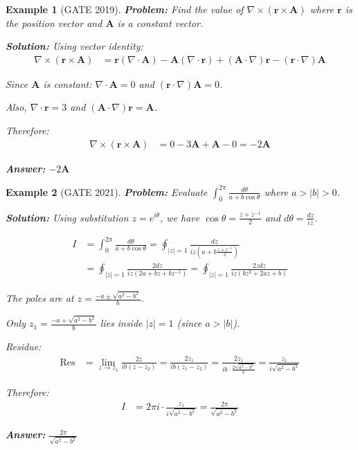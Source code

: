 \documentclass[12pt,a4paper]{article}
\newtheorem{example}{Example}[section]
\newcommand{\ans}[1]{\textcolor{red!70!black}{\textbf{Answer:} #1}}
\newcommand{\sol}{\textcolor{blue!70!black}{\textbf{Solution:}}}
\begin{document}
\begin{example}[GATE 2019]
\textbf{Problem:} Find the value of $\nabla \times (\mathbf{r} \times \mathbf{A})$ where $\mathbf{r}$ is the position vector and $\mathbf{A}$ is a constant vector.

\sol
Using vector identity:
\begin{align}
\nabla \times (\mathbf{r} \times \mathbf{A}) &= \mathbf{r}(\nabla \cdot \mathbf{A}) - \mathbf{A}(\nabla \cdot \mathbf{r}) + (\mathbf{A} \cdot \nabla)\mathbf{r} - (\mathbf{r} \cdot \nabla)\mathbf{A}
\end{align}

Since $\mathbf{A}$ is constant: $\nabla \cdot \mathbf{A} = 0$ and $(\mathbf{r} \cdot \nabla)\mathbf{A} = 0$.

Also, $\nabla \cdot \mathbf{r} = 3$ and $(\mathbf{A} \cdot \nabla)\mathbf{r} = \mathbf{A}$.

Therefore:
\begin{align}
\nabla \times (\mathbf{r} \times \mathbf{A}) &= 0 - 3\mathbf{A} + \mathbf{A} - 0 = -2\mathbf{A}
\end{align}

\ans{$-2\mathbf{A}$}
\end{example}

\begin{example}[GATE 2021]
\textbf{Problem:} Evaluate $\int_0^{2\pi} \frac{d\theta}{a + b\cos\theta}$ where $a > |b| > 0$.

\sol
Using substitution $z = e^{i\theta}$, we have $\cos\theta = \frac{z + z^{-1}}{2}$ and $d\theta = \frac{dz}{iz}$.

\begin{align}
I &= \int_0^{2\pi} \frac{d\theta}{a + b\cos\theta} = \oint_{|z|=1} \frac{dz}{iz\left(a + b\frac{z+z^{-1}}{2}\right)}\\
&= \oint_{|z|=1} \frac{2dz}{iz(2a + bz + bz^{-1})} = \oint_{|z|=1} \frac{2zdz}{iz(bz^2 + 2az + b)}
\end{align}

The poles are at $z = \frac{-a \pm \sqrt{a^2 - b^2}}{b}$.

Only $z_1 = \frac{-a + \sqrt{a^2 - b^2}}{b}$ lies inside $|z| = 1$ (since $a > |b|$).

Residue:
\begin{align}
\text{Res} &= \lim_{z \to z_1} \frac{2z}{ib(z - z_2)} = \frac{2z_1}{ib(z_1 - z_2)} = \frac{2z_1}{ib \cdot \frac{2\sqrt{a^2-b^2}}{b}} = \frac{z_1}{i\sqrt{a^2-b^2}}
\end{align}

Therefore:
\begin{align}
I &= 2\pi i \cdot \frac{z_1}{i\sqrt{a^2-b^2}} = \frac{2\pi}{\sqrt{a^2-b^2}}
\end{align}

\ans{$\frac{2\pi}{\sqrt{a^2-b^2}}$}
\end{example}
\end{document}
